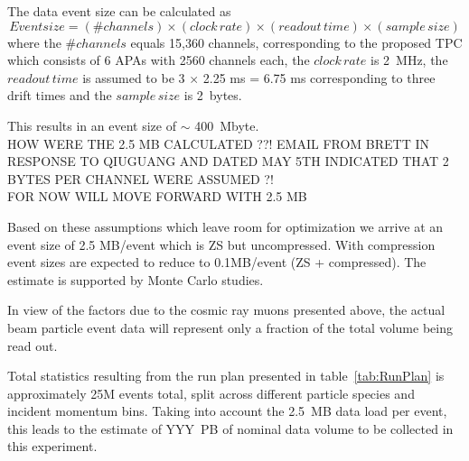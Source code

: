 The data event size can be calculated as
\begin{equation}
  Event size = (\#channels) \times (clock\, rate) \times (readout \, time) \times (sample \, size)
\end{equation}
where the $\# channels$ equals 15,360 channels, corresponding to the proposed TPC which consists of 6 APAs with 2560 channels each, 
the $clock \, rate$ is 2~MHz, the $readout \, time$ is assumed to be 3 $ \times $ 2.25 ms = 6.75 ms corresponding to three drift times and the $sample \, size$ is 2~bytes.

{\color{red} This results in an event size of $\sim$ 400~Mbyte.\\
HOW WERE THE 2.5 MB CALCULATED ??! EMAIL FROM BRETT IN RESPONSE TO QIUGUANG AND DATED MAY 5TH INDICATED THAT 2 BYTES PER CHANNEL WERE ASSUMED ?!\\
FOR NOW WILL MOVE FORWARD WITH 2.5 MB\\}
%

Based on these assumptions which leave room for optimization
we arrive at an event size of 2.5 MB/event which is ZS but uncompressed.
With compression event sizes are expected to reduce to 0.1MB/event (ZS + compressed).
%
%
The estimate is supported by Monte Carlo studies.


In view of the factors due to the cosmic ray muons presented above, the actual beam particle event data will represent only a fraction of
the total volume being read out.  

Total statistics resulting from the run plan presented in table~\ref{tab:RunPlan} is approximately 25M events total, 
split across different particle species and incident momentum bins. Taking into account the 2.5~MB data load per event, 
this leads to the estimate of YYY~PB of nominal data volume to be collected in this experiment. 

